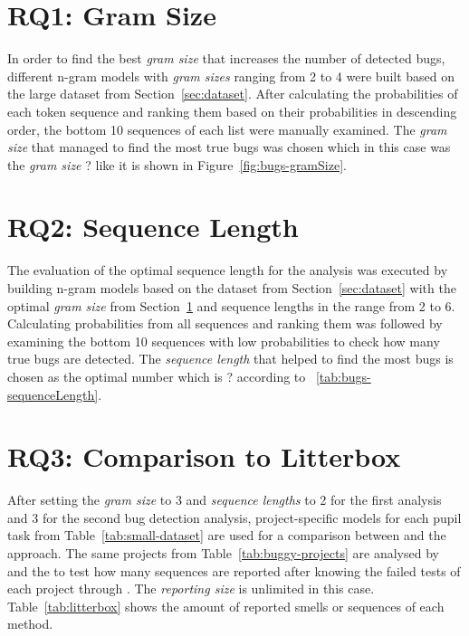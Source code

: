 \section{RQ1: Gram Size}\label{sec:gram_size}
In order to find the best \textit{gram size} that increases the number of detected bugs, different n-gram models with \textit{gram sizes} ranging from 2 to 4 were built based on the large dataset from Section~\ref{sec:dataset}. After calculating the probabilities of each token sequence and ranking them based on their probabilities in descending order, the bottom 10 sequences of each list were manually examined. The \textit{gram size} that managed to find the most true bugs was chosen which in this case was the \textit{gram size} ? like it is shown in Figure~\ref{fig:bugs-gramSize}. 



\section{RQ2: Sequence Length}\label{sec:sequence_length}
The evaluation of the optimal sequence length for the analysis was executed by building n-gram models based on the dataset from Section~\ref{sec:dataset} with the optimal \textit{gram size} from Section~\ref{sec:gram_size} and {sequence lengths} in the range from 2 to 6. Calculating probabilities from all sequences and ranking them was followed by examining the bottom 10 sequences with low probabilities to check how many true bugs are detected. The \textit{sequence length} that helped to find the most bugs is chosen as the optimal number which is ? according to ~\ref{tab:bugs-sequenceLength}. 



\section{RQ3: Comparison to Litterbox}\label{sec:litterbox}
After setting the \textit{gram size} to 3 and \textit{sequence lengths} to 2 for the first analysis and 3 for the second bug detection analysis, project-specific models for each pupil task from Table~\ref{tab:small-dataset} are used for a comparison between \litterbox{} and the \ngram{} approach. The same projects from Table~\ref{tab:buggy-projects} are analysed by \litterbox{} and the \ngram{} to test how many sequences are reported after knowing the failed tests of each project through \whisker{}. The \textit{reporting size} is unlimited in this case. Table~\ref{tab:litterbox} shows the amount of reported smells or sequences of each method. 

